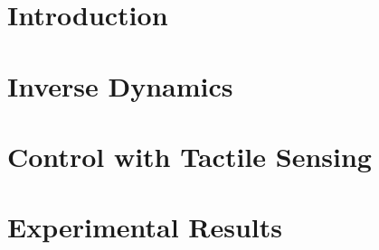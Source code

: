 



\begin{abstract}
	
\end{abstract}



\section{Introduction}
\label{Introduction}

	 
    

\section{Inverse Dynamics}
\label{sec:problem}

	 


\section{Control with Tactile Sensing} 
\label{sec:method}

	 


\section{Experimental Results}
\label{sec:results}

	 


	


